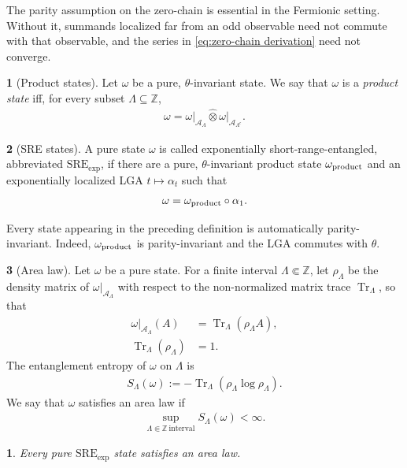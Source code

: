 \documentclass[a4paper,10pt]{article}
\numberwithin{equation}{section}
\theoremstyle{plain}
\theoremstyle{plain}
\theoremstyle{plain}
\theoremstyle{plain}
\theoremstyle{plain}
\newtheorem{claim}[claim]{\protect\claimname}
\theoremstyle{remark}
\theoremstyle{definition}
\newtheorem{defn}[defn]{\protect\definitionname}
\providecommand{\claimname}{Claim}
\providecommand{\definitionname}{Definition}
\newcommand{\ZZ}{\mathbb{Z}}
\newcommand{\calA}{\mathcal{A}}
\newcommand{\eq}[1]{\begin{align*}#1\end{align*}}
\newcommand{\eql}[1]{\begin{align}#1\end{align}}
\newcommand{\br}[1]{\left(#1\right)}
\begin{document}
The parity assumption on the zero-chain is essential in the Fermionic
setting. Without it, summands localized far from an odd observable need
not commute with that observable, and the series in
\cref{eq:zero-chain derivation} need not converge.

\begin{defn}[Product states]
Let $\omega$ be a pure, $\theta$-invariant state. We say that $\omega$ is
a \emph{product state} iff, for every subset $\Lambda\subseteq\ZZ$,
\eq{
    \omega
    =
    \left.\omega\right|_{\calA_\Lambda}
    \hat{\otimes}
    \left.\omega\right|_{\calA_{\Lambda^c}}.
}
\end{defn}

\begin{defn}[SRE states]
A pure state $\omega$ is called exponentially short-range-entangled,
abbreviated $\mathrm{SRE}_{\exp}$, if there are a pure,
$\theta$-invariant product state $\omega_{\rm product}$ and an
exponentially localized LGA $t\mapsto\alpha_t$ such that
\eq{
    \omega
    =
    \omega_{\rm product}\circ\alpha_1.
}
\end{defn}

Every state appearing in the preceding definition is automatically
parity-invariant. Indeed, $\omega_{\rm product}$ is parity-invariant and
the LGA commutes with $\theta$.

\begin{defn}[Area law]
Let $\omega$ be a pure state. For a finite interval
$\Lambda\Subset\ZZ$, let $\rho_\Lambda$ be the density matrix of
$\left.\omega\right|_{\calA_\Lambda}$ with respect to the
non-normalized matrix trace $\operatorname{Tr}_\Lambda$, so that
\eq{
    \left.\omega\right|_{\calA_\Lambda}(A)
    &=
    \operatorname{Tr}_\Lambda
    \br{
        \rho_\Lambda A
    },\\
    \operatorname{Tr}_\Lambda
    \br{
        \rho_\Lambda
    }
    &=
    1.
}
The entanglement entropy of $\omega$ on $\Lambda$ is
\eq{
    S_\Lambda(\omega)
    :=
    -
    \operatorname{Tr}_\Lambda
    \br{
        \rho_\Lambda\log\rho_\Lambda
    }.
}
We say that $\omega$ satisfies an area law if
\eql{\label{eq:area law definition}
    \sup_{
        \Lambda\Subset\ZZ\
        \mathrm{interval}
    }
    S_\Lambda(\omega)
    <
    \infty.
}
\end{defn}

\begin{claim}
\label{claim:SRE implies area law}
Every pure $\mathrm{SRE}_{\exp}$ state satisfies an area law.
\end{claim}
\end{document}
